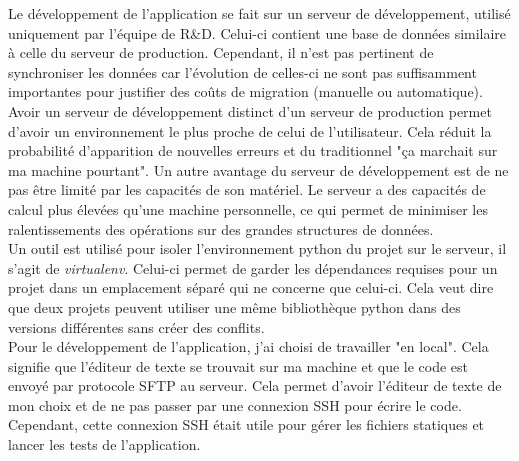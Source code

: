 Le développement de l'application se fait sur un serveur de développement, utilisé uniquement par l'équipe de R\&D. Celui-ci contient une base de données similaire à celle du serveur de production. Cependant, il n'est pas pertinent de synchroniser les données car l'évolution de celles-ci ne sont pas suffisamment importantes pour justifier des coûts de migration (manuelle ou automatique). Avoir un serveur de développement distinct d'un serveur de production permet d'avoir un environnement le plus proche de celui de l'utilisateur. Cela réduit la probabilité d'apparition de nouvelles erreurs et du traditionnel "ça marchait sur ma machine pourtant". Un autre avantage du serveur de développement est de ne pas être limité par les capacités de son matériel. Le serveur a des capacités de calcul plus élevées qu'une machine personnelle, ce qui permet de minimiser les ralentissements des opérations sur des grandes structures de données.\\

Un outil est utilisé pour isoler l'environnement python du projet sur le serveur, il s'agit de \textit{virtualenv}. Celui-ci permet de garder les dépendances requises pour un projet dans un emplacement séparé qui ne concerne que celui-ci. Cela veut dire que deux projets peuvent utiliser une même bibliothèque python dans des versions différentes sans créer des conflits.\\

Pour le développement de l'application, j'ai choisi de travailler "en local". Cela signifie que l'éditeur de texte se trouvait sur ma machine et que le code est envoyé par protocole SFTP au serveur. Cela permet d'avoir l'éditeur de texte de mon choix et de ne pas passer par une connexion SSH pour écrire le code. Cependant, cette connexion SSH était utile pour gérer les fichiers statiques et lancer les tests de l'application.\\